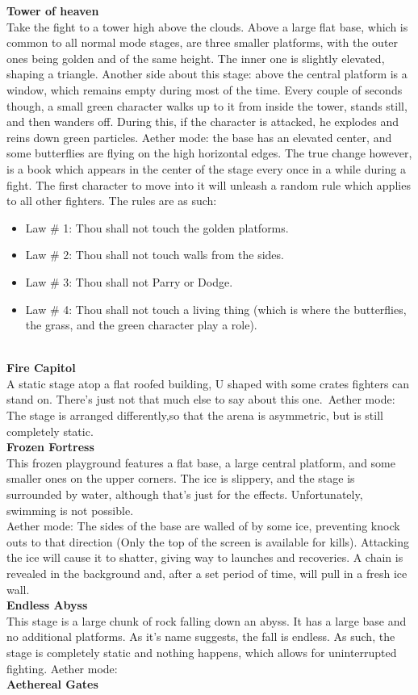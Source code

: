 \documentclass{article}
\begin{document}
\textbf{Tower of heaven}\\
Take the fight to a tower high above the clouds. Above a large flat base, which is common to all normal mode stages, are three smaller platforms, with the outer ones being golden and of the same height. The inner one is slightly elevated, shaping a triangle. Another side about this stage: above the central platform is a window, which remains empty during most of the time. Every couple of seconds though, a small green character walks up to it from inside the tower, stands still, and then wanders off. During this, if the character is attacked, he explodes and reins down green particles.
Aether mode: the base has an elevated center, and some butterflies are flying on the high horizontal edges. The true change however, is a book which appears in the center of the stage every once in a while during a fight. The first character to move into it will unleash a random rule which applies to all other fighters. The rules are as such:\\
\begin{itemize}
\item Law # 1: Thou shall not touch the golden platforms.
\item Law # 2: Thou shall not touch walls from the sides.
\item Law # 3: Thou shall not Parry or Dodge.
\item Law # 4: Thou shall not touch a living thing (which is where the butterflies, the grass, and the green character play a role).
\end{itemize}
\\

\textbf{Fire Capitol}\\
A static stage atop a flat roofed building, U shaped with some crates fighters can stand on. There's just not that much else to say about this one.\
Aether mode: The stage is arranged differently,so that the arena is asymmetric, but is still completely static.\\
\textbf{Frozen Fortress}\\
This frozen playground features a flat base, a large central platform, and some smaller ones on the upper corners. The ice is slippery, and the stage is surrounded by water, although that's just for the effects. Unfortunately, swimming is not possible.\\
Aether mode: The sides of the base are walled of by some ice, preventing knock outs to that direction (Only the top of the screen is available for kills). Attacking the ice will cause it to shatter, giving way to launches and recoveries. A chain is revealed in the background and, after a set period of time, will pull in a fresh ice wall.
\\
\textbf{Endless Abyss}\\
This stage is a large chunk of rock falling down an abyss. It has a large base and no additional platforms. As it's name suggests, the fall is endless. As such, the stage is completely static and nothing happens, which allows for uninterrupted fighting.
Aether mode: %
\\
\textbf{Aethereal Gates}\\
\end{document}
